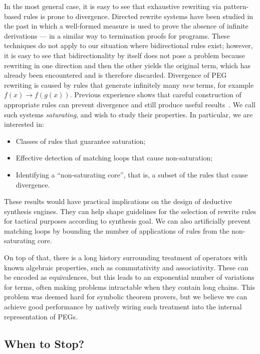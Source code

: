 In the most general case, it is easy to see that exhaustive rewriting via
pattern-based rules is prone to divergence.
Directed rewrite systems have been studied in the past in which a well-formed
measure is used to prove the absence of infinite derivations --- in a similar
way to termination proofs for programs.
These techniques do not apply to our situation where bidirectional rules exist;
however, it is easy to see that bidirectionality by itself does not pose a
problem because rewriting in one direction and then the other yields the
original term, which has already been encountered and is therefore discarded.
Divergence of PEG rewriting is caused by rules that generate infinitely many
\emph{new} terms, for example $f(x) \to f(g(x))$.
Previous experience shows that careful construction of appropriate rules can
prevent divergence and still produce useful results~\cite{LPAR2013/Itzhaky}.
We call such systems \emph{saturating}, and wish to study their properties.
In particular, we are interested in:
\begin{itemize}
  \item Classes of rules that guarantee saturation;
  \item Effective detection of matching loops that cause non-saturation;
  \item Identifying a ``non-saturating core'', that is, a subset of the
    rules that cause divergence. 
\end{itemize}

These results would have practical implications on the design of
deductive synthesis engines.
They can help shape guidelines for the selection of rewrite rules for
tactical purposes according to synthesis goal.
We can also artificially prevent matching loops by bounding the number of
applications of rules from the non-saturating core.

On top of that, there is a long history surrounding treatment of
operators with known algebraic properties, such as commutativity
and associativity.
These can be encoded as equivalences, but this leads to an exponential
number of variations for terms, often making problems intractable when
they contain long chains.
This problem was deemed hard for symbolic theorem provers, but we
believe we can achieve good performance by natively wiring such treatment
into the internal representation of PEGs.

\subsection{When to Stop?}

